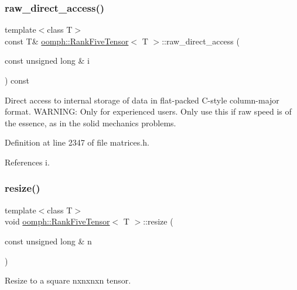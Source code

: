 \subsubsection{\texorpdfstring{raw\+\_\+direct\+\_\+access()}{raw\_direct\_access()}\hspace{0.1cm}{\footnotesize\ttfamily [2/2]}}
{\footnotesize\ttfamily template$<$class T$>$ \\
const T\& \hyperlink{classoomph_1_1RankFiveTensor}{oomph\+::\+Rank\+Five\+Tensor}$<$ T $>$\+::raw\+\_\+direct\+\_\+access (\begin{DoxyParamCaption}\item[{const unsigned long \&}]{i }\end{DoxyParamCaption}) const\hspace{0.3cm}{\ttfamily [inline]}}



Direct access to internal storage of data in flat-\/packed C-\/style column-\/major format. W\+A\+R\+N\+I\+NG\+: Only for experienced users. Only use this if raw speed is of the essence, as in the solid mechanics problems. 



Definition at line 2347 of file matrices.\+h.



References i.

\mbox{\label{classoomph_1_1RankFiveTensor_a8d0f38a3627c9d07dbf1106a26f61578}} 
\subsubsection{\texorpdfstring{resize()}{resize()}\hspace{0.1cm}{\footnotesize\ttfamily [1/3]}}
{\footnotesize\ttfamily template$<$class T$>$ \\
void \hyperlink{classoomph_1_1RankFiveTensor}{oomph\+::\+Rank\+Five\+Tensor}$<$ T $>$\+::resize (\begin{DoxyParamCaption}\item[{const unsigned long \&}]{n }\end{DoxyParamCaption})\hspace{0.3cm}{\ttfamily [inline]}}



Resize to a square nxnxnxn tensor. 



